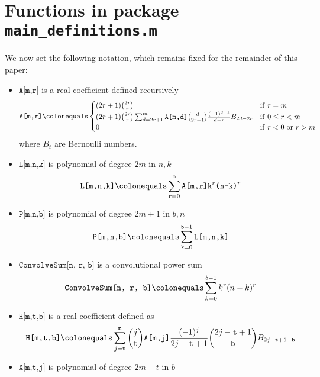 \documentclass[12pt, letterpaper]{amsart}
\newenvironment{myitemize}
{ \begin{itemize}
    \setlength{\itemsep}{4pt}
    \setlength{\parskip}{4pt}
    \setlength{\parsep}{4pt}     }
{ \end{itemize}                  }
\newcommand \coeffA [3][A]{\texttt{#1[#2,#3]}}
\newcommand \coeffH [4][H]{\texttt{#1[#2,#3,#4]}}
\newcommand \coeffX [4][X]{\texttt{#1[#2,#3,#4]}}
\newcommand \mynotationFixed [4][P]{\texttt{#1[#2,#3,#4]}}
\newcommand \polynomLFixed [4][L]{\texttt{#1[#2,#3,#4]}}
\theoremstyle{definition}
\theoremstyle{remark}
\numberwithin{equation}{section}
\begin{document}
\section{Functions in package \texttt{main\_definitions.m}}
We now set the following notation, which remains fixed for the remainder of this paper:
\begin{myitemize}
\item $\coeffA{m}{r}$ is a real coefficient defined recursively
\begin{equation*}
\coeffA{m}{r} \colonequals
\begin{cases}
(2r+1)\binom{2r}{r} & \mathrm{if } \ r=m \\
(2r+1)\binom{2r}{r} \sum_{d=2r+1}^{m} \coeffA{m}{d} \binom{d}{2r+1} \frac{(-1)^{d-1}}{d-r} B_{2d-2r} & \mathrm{if } \ 0 \leq r < m \\
0 & \mathrm{if } \ r<0 \ \mathrm{or } \ r>m
\end{cases}
\end{equation*}
where $B_t$ are Bernoulli numbers.
\item $\polynomLFixed{m}{n}{k}$ is polynomial of degree $2m$ in $n,k$
\begin{equation*}
\polynomLFixed{m}{n}{k} \colonequals \sum_{r=0}^{\texttt{m}} \coeffA{m}{r} \texttt{k}^r \texttt{(n-k)}^r
\end{equation*}
\item $\mynotationFixed{m}{n}{b}$ is polynomial of degree $2m+1$ in $b, n$
\begin{equation*}
\label{p_definition}
\mynotationFixed{m}{n}{b} \colonequals \sum_{\texttt{k}=0}^{\texttt{b}-1} \polynomLFixed{m}{n}{k}
\end{equation*}
\item $\texttt{ConvolveSum[n, r, b]}$ is a convolutional power sum
\begin{equation*}
\label{q_definition}
\texttt{ConvolveSum[n, r, b]} \colonequals \sum_{k=0}^{b-1} k^r(n-k)^r
\end{equation*}
\item $\coeffH{m}{t}{b}$ is a real coefficient defined as
\begin{equation*}
\coeffH{m}{t}{b} \colonequals \sum_{j=\texttt{t}}^{\texttt{m}} \binom{j}{\texttt{t}} \coeffA{m}{j} \frac{(-1)^j}{2j-\texttt{t}+1} \binom{2j-\texttt{t}+1}{\texttt{b}} B_{2j-\texttt{t}+1-\texttt{b}}
\end{equation*}
\item $\coeffX{m}{t}{j}$ is polynomial of degree $2m-t$ in $b$
\begin{equation*}

\end{equation*}
\end{myitemize}
\end{document}
